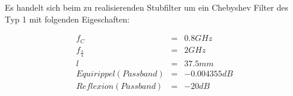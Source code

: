 Es handelt sich beim zu realisierenden Stubfilter um ein Chebyshev Filter des Typ 1 mit folgenden Eigeschaften: 
\begin{mdframed}
    \begin{equation*} 
        \begin{array}{cllll} 
            f_C & = & 0.8 GHz \\ 
            f_\frac{\lambda}{4} & = & 2 GHz \\ 
            l & = & 37.5mm \\
            Equirippel (Passband) & = & -0.004355 dB \\
            Reflexion (Passband) & = & -20 dB \\
        \end{array} 
    \end{equation*} 
\end{mdframed}



